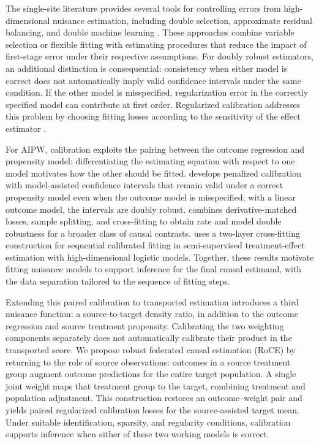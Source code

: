 \documentclass[12pt]{article}
\begin{document}
The single-site literature provides several tools for controlling errors from high-dimensional nuisance estimation, including double selection, approximate residual balancing, and double machine learning \citep{belloni2014inference,athey2018approximate,chernozhukov2018double}. These approaches combine variable selection or flexible fitting with estimating procedures that reduce the impact of first-stage error under their respective assumptions. For doubly robust estimators, an additional distinction is consequential: consistency when either model is correct does not automatically imply valid confidence intervals under the same condition. If the other model is misspecified, regularization error in the correctly specified model can contribute at first order. Regularized calibration addresses this problem by choosing fitting losses according to the sensitivity of the effect estimator \citep{vermeulen2015bias,tan2020model,smucler2019unifying}.

For AIPW, calibration exploits the pairing between the outcome regression and propensity model: differentiating the estimating equation with respect to one model motivates how the other should be fitted. \citet{tan2020model} develops penalized calibration with model-assisted confidence intervals that remain valid under a correct propensity model even when the outcome model is misspecified; with a linear outcome model, the intervals are doubly robust. \citet{smucler2019unifying} combines derivative-matched losses, sample splitting, and cross-fitting to obtain rate and model double robustness for a broader class of causal contrasts. \citet{hou2025efficient} uses a two-layer cross-fitting construction for sequential calibrated fitting in semi-supervised treatment-effect estimation with high-dimensional logistic models. Together, these results motivate fitting nuisance models to support inference for the final causal estimand, with the data separation tailored to the sequence of fitting steps.

Extending this paired calibration to transported estimation introduces a third nuisance function: a source-to-target density ratio, in addition to the outcome regression and source treatment propensity. Calibrating the two weighting components separately does not automatically calibrate their product in the transported score. We propose robust federated causal estimation (RoCE) by returning to the role of source observations: outcomes in a source treatment group augment outcome predictions for the entire target population. A single joint weight maps that treatment group to the target, combining treatment and population adjustment. This construction restores an outcome--weight pair and yields paired regularized calibration losses for the source-assisted target mean. Under suitable identification, sparsity, and regularity conditions, calibration supports inference when either of these two working models is correct.
\end{document}

